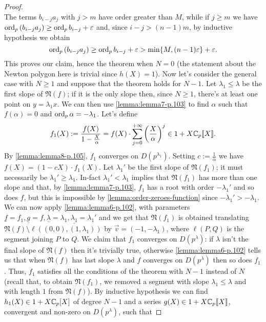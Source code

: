 \begin{proof}
\[			\]
			The terms $b_{i-j}a_j$ with $j > m$ have \padic order greater than $M$, while if $j \geq m$ we have $\textrm{ord}_p\,(b_{i-j}a_j) \geq \textrm{ord}_p\, b_{i-j} + \varepsilon$ and, since $i - j > (n-1)m$, by inductive hypothesis we obtain
			\[	
				\textrm{ord}_p\,(b_{i-j}a_j) \geq \textrm{ord}_p\, b_{i-j} + \varepsilon > \min\{M, (n-1)\varepsilon\} + \varepsilon.
			\]
			This proves our claim, hence the theorem when $N = 0$ (the statement about the Newton polygon here is trivial since $h(X) = 1$).\newline
			Now let's consider the general case with $N \geq 1$ and suppose that the theorem holds for $N - 1$. Let $\lambda_1 \leq \lambda$ be the first slope of $\mathfrak{N}(f)$; if it is the only slope then, since $N \geq 1$, there's at least one point on $y = \lambda_1x$. We can then use \cref{lemma:lemma7-p.103} to find $\alpha$ such that $f(\alpha) = 0$ and $\textrm{ord}_p\, \alpha = -\lambda_1$. Let's define
			\[
				f_1(X) := \frac{f(X)}{1 - \frac{X}{\alpha}} = f(X) \cdot \sum_{j=0}^{+\infty} \left(\frac{X}{\alpha}\right)^j \in 1 + X\mathbb{C}_p\llbracket {X} \rrbracket.
			\]
			By \cref{lemma:lemma8-p.105}, $f_1$ converges on $D(p^{\lambda_1})$. Setting $c := \tfrac{1}{\alpha}$ we have $f(X) = (1 - cX)\cdot f_1(X)$. Let $\lambda_1'$ be the first slope of $\mathfrak{N}(f_1)$; it must necessarily be $\lambda_1' \geq \lambda_1$. In-fact $\lambda_1' < \lambda_1$ implies that $\mathfrak{N}(f_1)$ has more than one slope and that, by \cref{lemma:lemma7-p.103}, $f_1$ has a root with \padic order $-\lambda_1'$ and so does $f$, but this is impossible by \cref{lemma:order-zeroes-function} since $-\lambda_1' > -\lambda_1$. We can now apply \cref{lemma:lemma6-p.102}, with parameters $\underline{f} = f_1, \underline{g} = f, \underline{\lambda} = \lambda_1, \underline{\lambda_1} = \lambda_1'$ and we get that $\mathfrak{N}(f_1)$ is obtained translating $\mathfrak{N}(f) \setminus \ell((0,0), (1, \lambda_1))$ by $\vec{v} = (-1, -\lambda_1)$, where $\ell(P, Q)$ is the segment joining $P$ to $Q$. We claim that $f_1$ converges on $D(p^{\lambda})$: if $\lambda$ isn't the final slope of $\mathfrak{N}(f)$ then it's trivially true, otherwise \cref{lemma:lemma6-p.102} tells us that when $\mathfrak{N}(f)$ has last slope $\lambda$ and $f$ converges on $D(p^{\lambda})$ then so does $f_1$. Thus, $f_1$ satisfies all the conditions of the theorem with $N-1$ instead of $N$ (recall that, to obtain $\mathfrak{N}(f_1)$, we removed a segment with slope $\lambda_1 \leq \lambda$ and with length $1$ from $\mathfrak{N}(f)$). By inductive hypothesis we can find $h_1(X) \in 1 + X\mathbb{C}_p[X]$ of degree $N-1$ and a series $g(X) \in 1 + X\mathbb{C}_p\llbracket {X} \rrbracket$, convergent and non-zero on $D(p^{\lambda})$, such that

\end{proof}
